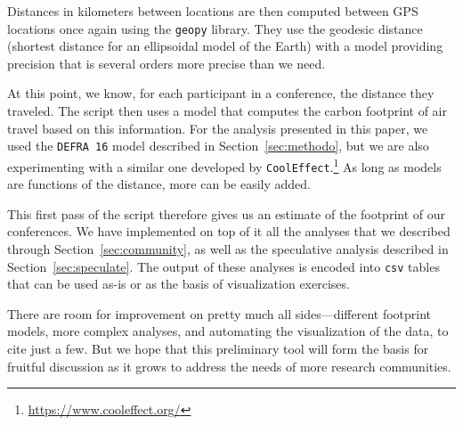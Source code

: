 Distances in kilometers between locations are then computed between GPS
locations once again using the \texttt{geopy} library. They use the geodesic
distance (shortest distance for an ellipsoidal model of the Earth) with a
model providing precision that is several orders more precise than we need.

At this point, we know, for each participant in a conference, the
distance they traveled. The script then uses a model that computes the
carbon footprint of air travel based on this information. For the analysis
presented in this paper, we used the \texttt{DEFRA 16} model described in
Section~\ref{sec:methodo}, but we are also experimenting with a similar one
developed by
\texttt{CoolEffect}.\footnote{\url{https://www.cooleffect.org/}}  As long as
models are functions of the distance, more can be easily added.

This first pass of the script therefore gives us an estimate of the
footprint of our conferences. We have implemented on top of it all the
analyses that we described through Section~\ref{sec:community}, as well as
the speculative analysis described in Section~\ref{sec:speculate}. The
output of these analyses is encoded into \texttt{csv} tables that can be
used as-is or as the basis of visualization exercises.

There are room for improvement on pretty much all sides---different
footprint models, more complex analyses, and automating the visualization of
the data, to cite just a few. But we hope that this preliminary tool will
form the basis for fruitful discussion as it grows to address the needs of
more research communities.
